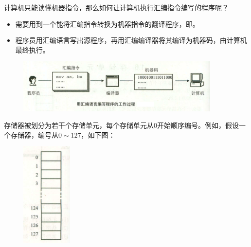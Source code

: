 \begin{frame}\ft{\secname}
\begin{wenti}
计算机只能读懂机器指令，那么如何让计算机执行汇编指令编写的程序呢？
\end{wenti}
\pause 

\begin{itemize}
\item[]
需要用到一个能将汇编指令转换为机器指令的翻译程序，即。\\[0.1in]
\item[]
程序员用汇编语言写出源程序，再用汇编编译器将其编译为机器码，由计算机最终执行。
\end{itemize}

\begin{figure}
\centering
\includegraphics[width=4in]{ch01/fig/asm_process}
\end{figure}
\end{frame}
%
\begin{frame}
存储器被划分为若干个存储单元，每个存储单元从$0$开始顺序编号。例如，假设一个存储器，编号从$0\sim 127$，如下图：
\begin{figure}
\centering
\includegraphics[width=1in]{ch01/fig/cunchudanyuan}
\end{figure}
\end{frame}
%
